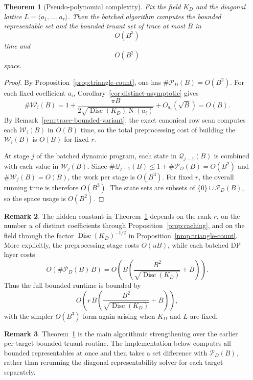 \documentclass[manuscript]{acmart}
\theoremstyle{plain}
\newtheorem{theorem}{Theorem}[section]
\theoremstyle{definition}
\theoremstyle{nonitalicremark}
\newtheorem{remark}[theorem]{Remark}
\newcommand{\N}{\operatorname{N}}
\newcommand{\Disc}{\operatorname{Disc}}
\newcommand{\cP}{\mathcal{P}}
\newcommand{\cQ}{\mathcal{Q}}
\newcommand{\cW}{\mathcal{W}}
\begin{document}
\begin{theorem}[Pseudo-polynomial complexity]\label{thm:pseudopoly}
Fix the field $K_D$ and the diagonal lattice $L=\langle a_1,\dots,a_r\rangle$. Then the batched
algorithm computes the bounded representable set and the bounded truant set of trace at most $B$ in
\[
O(B^3)
\]
time and
\[
O(B^2)
\]
space.
\end{theorem}

\begin{proof}
By Proposition~\ref{prop:triangle-count}, one has $\#\cP_D(B)=O(B^2)$. For each fixed coefficient
$a_i$, Corollary~\ref{cor:distinct-asymptotic} gives
\[
\#\cW_i(B)=1+\frac{\pi B}{2\sqrt{\Disc(K_D)\N(a_i)}} + O_{a_i}(\sqrt B)=O(B).
\]
By Remark~\ref{rem:trace-bounded-variant}, the exact canonical row scan computes each $\cW_i(B)$ in
$O(B)$ time, so the total preprocessing cost of building the $\cW_i(B)$ is $O(B)$ for fixed $r$.

At stage $j$ of the batched dynamic program, each state in $\cQ_{j-1}(B)$ is combined with each
value in $\cW_j(B)$. Since $\#\cQ_{j-1}(B)\le 1+\#\cP_D(B)=O(B^2)$ and $\#\cW_j(B)=O(B)$, the work
per stage is $O(B^3)$. For fixed $r$, the overall running time is therefore $O(B^3)$. The state sets
are subsets of $\{0\}\cup\cP_D(B)$, so the space usage is $O(B^2)$.
\end{proof}

\begin{remark}
The hidden constant in Theorem~\ref{thm:pseudopoly} depends on the rank $r$, on the number $u$ of
distinct coefficients through Proposition~\ref{prop:caching}, and on the field through the factor
$\Disc(K_D)^{-1/2}$ in Proposition~\ref{prop:triangle-count}. More explicitly, the preprocessing
stage costs $O(uB)$, while each batched DP layer costs
\[
O\!\left(\#\cP_D(B)\,B\right)
=
O\!\left(B\left(\frac{B^2}{\sqrt{\Disc(K_D)}}+B\right)\right).
\]
Thus the full bounded runtime is bounded by
\[
O\!\left(r\,B\left(\frac{B^2}{\sqrt{\Disc(K_D)}}+B\right)\right),
\]
with the simpler $O(B^3)$ form again arising when $K_D$ and $L$ are fixed.
\end{remark}

\begin{remark}
Theorem~\ref{thm:pseudopoly} is the main algorithmic strengthening over the earlier per-target
bounded-truant routine. The implementation below computes all bounded representables at once and then
takes a set difference with $\cP_D(B)$, rather than rerunning the diagonal representability solver
for each target separately.
\end{remark}
\end{document}
